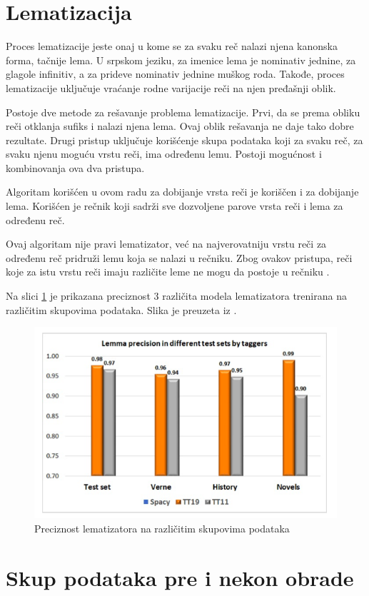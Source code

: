 \documentclass[12pt,oneside]{memoir}
\begin{document}
\section{Lematizacija}

Proces lematizacije jeste onaj u kome se za svaku reč nalazi njena kanonska forma, tačnije lema. U srpskom jeziku, za imenice lema je nominativ jednine,  za glagole infinitiv, a za prideve nominativ jednine muškog roda. Takođe, proces lematizacije uključuje vraćanje rodne varijacije reči na njen pređašnji oblik.

Postoje dve metode za rešavanje problema lematizacije.  Prvi, da se prema obliku reči otklanja sufiks i nalazi njena lema. Ovaj oblik rešavanja ne daje tako dobre rezultate.  Drugi pristup uključuje korišćenje skupa podataka koji za svaku reč, za svaku njenu moguću vrstu reči, ima određenu lemu. Postoji mogućnost i kombinovanja ova dva pristupa. 

Algoritam korišćen u ovom radu za dobijanje vrsta reči je koriščen i za dobijanje lema. Korišćen je rečnik koji sadrži sve dozvoljene parove vrsta reči i lema za određenu reč.

Ovaj algoritam nije pravi lematizator, već na najverovatniju vrstu reči za određenu reč pridruži lemu koja se nalazi u rečniku. Zbog ovakov pristupa, reči koje za istu vrstu reči imaju različite leme ne mogu da postoje u rečniku \cite{tagger}.

Na slici \ref{img:lemmatization} je prikazana preciznost 3 različita modela lematizatora trenirana na različitim skupovima podataka. Slika je preuzeta iz \cite{tagger}.

\begin{figure}[h!]
\centering
\includegraphics[width=.7\textwidth]{images/lemmatization.png}
\caption{Preciznost lematizatora na različitim skupovima podataka}
\label{img:lemmatization}
\end{figure}

\section{Skup podataka pre i nekon obrade}
\end{document}
